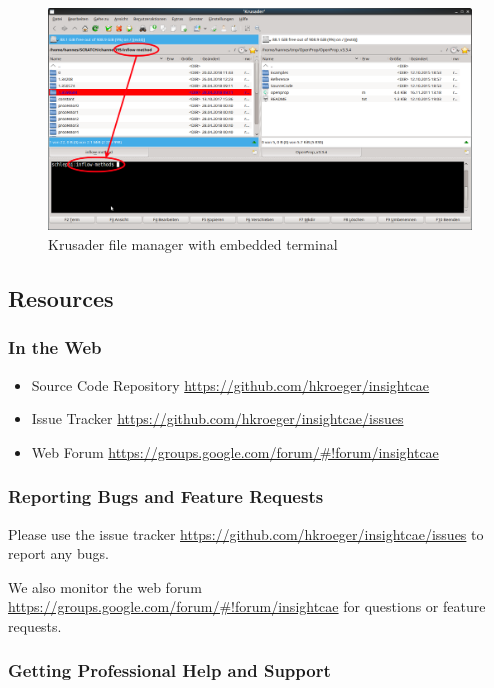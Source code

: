 \begin{enumerate}
 \begin{figure}[h!]
 \includegraphics[width=\linewidth]{figs/intro/krusader_with_terminal}
 \caption{Krusader file manager with embedded terminal}
 \label{fig:krusader}
 \end{figure}
 
\end{enumerate}


\subsection{Resources}

\subsubsection{In the Web}

\begin{itemize}
\item Source Code Repository \url{https://github.com/hkroeger/insightcae}
\item Issue Tracker \url{https://github.com/hkroeger/insightcae/issues}
\item Web Forum \url{https://groups.google.com/forum/#!forum/insightcae}
\end{itemize}

\subsubsection{Reporting Bugs and Feature Requests}

Please use the issue tracker \url{https://github.com/hkroeger/insightcae/issues} to report any bugs.

We also monitor the web forum \url{https://groups.google.com/forum/#!forum/insightcae} for questions or feature requests.

\subsubsection{Getting Professional Help and Support}

